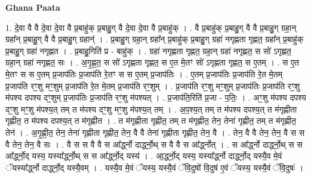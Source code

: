 \documentclass[17pt]{extarticle}
\begin{document}
\textbf{Ghana Paata } \newline

1. दे॒वा वै वै दे॒वा दे॒वा वै प्र॒बाहु॑क् प्र॒बाहु॒ग् वै दे॒वा दे॒वा वै प्र॒बाहु॑क् । . वै प्र॒बाहु॑क् प्र॒बाहु॒ग् वै वै प्र॒बाहु॒ग् ग्रहा॒न् ग्रहा᳚न् प्र॒बाहु॒ग् वै वै प्र॒बाहु॒ग् ग्रहान्॑ । . प्र॒बाहु॒ग् ग्रहा॒न् ग्रहा᳚न् प्र॒बाहु॑क् प्र॒बाहु॒ग् ग्रहा॑ नगृह्णता गृह्णत॒ ग्रहा᳚न् प्र॒बाहु॑क् प्र॒बाहु॒ग् ग्रहा॑ नगृह्णत । . प्र॒बाहु॒गिति॑ प्र - बाहु॑क् । . ग्रहा॑ नगृह्णता गृह्णत॒ ग्रहा॒न् ग्रहा॑ नगृह्णत॒ स सो॑ ऽगृह्णत॒ ग्रहा॒न् ग्रहा॑ नगृह्णत॒ सः । . अ॒गृ॒ह्ण॒त॒ स सो॑ ऽगृह्णता गृह्णत॒ स ए॒त मे॒तꣳ सो॑ ऽगृह्णता गृह्णत॒ स ए॒तम् । . स ए॒त मे॒तꣳ स स ए॒तम् प्र॒जाप॑तिः प्र॒जाप॑ति रे॒तꣳ स स ए॒तम् प्र॒जाप॑तिः । . ए॒तम् प्र॒जाप॑तिः प्र॒जाप॑ति रे॒त मे॒तम् प्र॒जाप॑ति रꣳ॒॒शु मꣳ॒॒शुम् प्र॒जाप॑ति रे॒त मे॒तम् प्र॒जाप॑ति रꣳ॒॒शुम् । . प्र॒जाप॑ति रꣳ॒॒शु मꣳ॒॒शुम् प्र॒जाप॑तिः प्र॒जाप॑ति रꣳ॒॒शु म॑पश्य दपश्य दꣳ॒॒शुम् प्र॒जाप॑तिः प्र॒जाप॑ति रꣳ॒॒शु म॑पश्यत् । . प्र॒जाप॑ति॒रिति॑ प्र॒जा - प॒तिः॒ । . अꣳ॒॒शु म॑पश्य दपश्य दꣳ॒॒शु मꣳ॒॒शु म॑पश्य॒त् तम् त म॑पश्य दꣳ॒॒शु मꣳ॒॒शु म॑पश्य॒त् तम् । . अ॒प॒श्य॒त् तम् त म॑पश्य दपश्य॒त् त म॑गृह्णीता गृह्णीत॒ त म॑पश्य दपश्य॒त् त म॑गृह्णीत । . त म॑गृह्णीता गृह्णीत॒ तम् त म॑गृह्णीत॒ तेन॒ तेना॑ गृह्णीत॒ तम् त म॑गृह्णीत॒ तेन॑ । . अ॒गृ॒ह्णी॒त॒ तेन॒ तेना॑ गृह्णीता गृह्णीत॒ तेन॒ वै वै तेना॑ गृह्णीता गृह्णीत॒ तेन॒ वै । . तेन॒ वै वै तेन॒ तेन॒ वै स स वै तेन॒ तेन॒ वै सः । . वै स स वै वै स आ᳚र्द्ध्नो दार्द्ध्नो॒थ् स वै वै स आ᳚र्द्ध्नोत् । . स आ᳚र्द्ध्नो दार्द्ध्नो॒थ् स स आ᳚र्द्ध्नो॒द् यस्य॒ यस्या᳚र्द्ध्नो॒थ् स स आ᳚र्द्ध्नो॒द् यस्य॑ । . आ॒र्द्ध्नो॒द् यस्य॒ यस्या᳚र्द्ध्नो दार्द्ध्नो॒द् यस्यै॒व मे॒वं ॅयस्या᳚र्द्ध्नो दार्द्ध्नो॒द् यस्यै॒वम् । . यस्यै॒व मे॒वं ॅयस्य॒ यस्यै॒वं ॅवि॒दुषो॑ वि॒दुष॑ ए॒वं ॅयस्य॒ यस्यै॒वं ॅवि॒दुषः॑ । \newline
\end{document}
